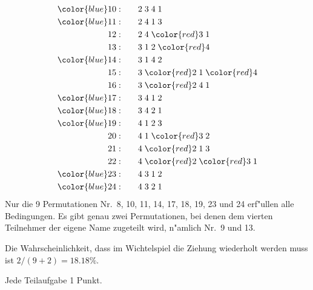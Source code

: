 \begin{loesung}
\begin{teilaufgaben}
\begin{align*}
{\color{blue}
10:}\qquad&            2 \;            3 \;            4 \;            1 \\
{\color{blue}
11:}\qquad&            2 \;            4 \;            1 \;            3 \\
12: \qquad&            2 \;            4 \;{\color{red}3}\;            1 \\
%
13: \qquad&            3 \;            1 \;            2 \;{\color{red}4}\\
{\color{blue}
14:}\qquad&            3 \;            1 \;            4 \;            2 \\
15: \qquad&            3 \;{\color{red}2}\;            1 \;{\color{red}4}\\
16: \qquad&            3 \;{\color{red}2}\;            4 \;            1 \\
{\color{blue}
17:}\qquad&            3 \;            4 \;            1 \;            2 \\
{\color{blue}
18:}\qquad&            3 \;            4 \;            2 \;            1 \\
%
{\color{blue}
19:}\qquad&            4 \;            1 \;            2 \;            3 \\
20: \qquad&            4 \;            1 \;{\color{red}3}\;            2 \\
21: \qquad&            4 \;{\color{red}2}\;            1 \;            3 \\
22: \qquad&            4 \;{\color{red}2}\;{\color{red}3}\;            1 \\
{\color{blue}
23:}\qquad&            4 \;            3 \;            1 \;            2 \\
{\color{blue}
24:}\qquad&            4 \;            3 \;            2 \;            1
\end{align*}
Nur die 9 Permutationen Nr.~{\color{blue}8},
{\color{blue}10},
{\color{blue}11},
{\color{blue}14},
{\color{blue}17},
{\color{blue}18},
{\color{blue}19},
{\color{blue}23} und
{\color{blue}24} erf"ullen
alle Bedingungen.
Es gibt genau zwei Permutationen, bei denen dem vierten Teilnehmer der
eigene Name zugeteilt wird, n"amlich Nr.~{\color{blue}9} und {\color{blue}13}.
\item
Die Wahrscheinlichkeit, dass im Wichtelspiel die Ziehung wiederholt 
werden muss ist $2/(9 + 2)=18.18\%$.
\end{teilaufgaben}
\end{loesung}

\begin{bewertung}
Jede Teilaufgabe 1 Punkt.
\end{bewertung}

